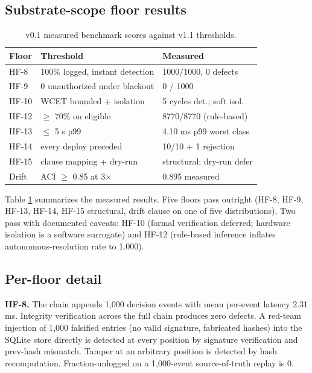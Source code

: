 \documentclass[conference]{IEEEtran}
\theoremstyle{definition}
\theoremstyle{plain}
\theoremstyle{remark}
\begin{document}
\subsection{Substrate-scope floor results}

\begin{table}[t]
\centering
\caption{v0.1 measured benchmark scores against v1.1 thresholds.}
\label{tab:results}
\begin{tabular}{lll}
\toprule
Floor & Threshold & Measured \\
\midrule
HF-8 & 100\% logged, instant detection & 1000/1000, 0 defects \\
HF-9 & 0 unauthorized under blackout & 0 / 1000 \\
HF-10 & WCET bounded + isolation & 5 cycles det.; soft isol. \\
HF-12 & $\geq$ 70\% on eligible & 8770/8770 (rule-based) \\
HF-13 & $\leq$ 5 s p99 & 4.10 ms p99 worst class \\
HF-14 & every deploy preceded & 10/10 + 1 rejection \\
HF-15 & clause mapping + dry-run & structural; dry-run defer \\
Drift & ACI $\geq$ 0.85 at 3$\times$ & 0.895 measured \\
\bottomrule
\end{tabular}
\end{table}

Table \ref{tab:results} summarizes the measured results. Five floors pass outright (HF-8, HF-9, HF-13, HF-14, HF-15 structural, drift clause on one of five distributions). Two pass with documented caveats: HF-10 (formal verification deferred; hardware isolation is a software surrogate) and HF-12 (rule-based inference inflates autonomous-resolution rate to 1.000).

\subsection{Per-floor detail}

\textbf{HF-8.} The chain appends 1{,}000 decision events with mean per-event latency 2.31 ms. Integrity verification across the full chain produces zero defects. A red-team injection of 1{,}000 falsified entries (no valid signature, fabricated hashes) into the SQLite store directly is detected at every position by signature verification and prev-hash mismatch. Tamper at an arbitrary position is detected by hash recomputation. Fraction-unlogged on a 1{,}000-event source-of-truth replay is 0.
\end{document}

